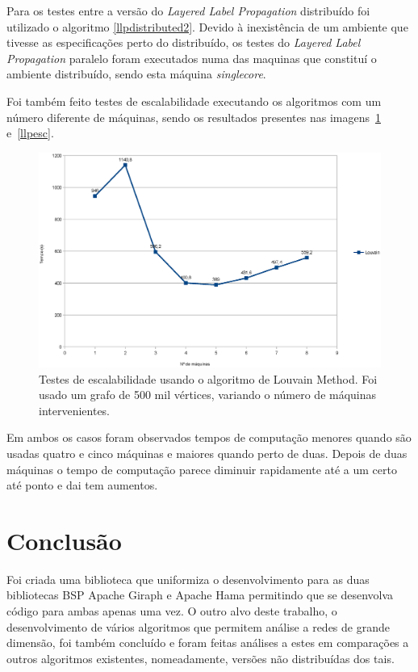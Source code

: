 Para os testes entre a versão do \textit{Layered Label Propagation} distribuído 
foi utilizado o algoritmo \ref{llpdistributed2}. Devido à inexistência de um 
ambiente que tivesse as especificações perto do distribuído, os testes do 
\textit{Layered Label Propagation} paralelo foram executados numa das maquinas 
que constituí o ambiente distribuído, sendo esta máquina \textit{singlecore}.

Foi também feito testes de escalabilidade executando os algoritmos com um número diferente de máquinas, sendo os resultados presentes nas imagens~\ref{louvainesc} e~\ref{llpesc}.

\begin{figure}
  \centering
  \includegraphics[width=\linewidth]{lov}
  \caption{Testes de escalabilidade usando o algoritmo de Louvain Method. Foi usado um grafo de 500 mil vértices, variando o número de máquinas intervenientes.}
	\label{louvainesc}
\end{figure}

Em ambos os casos foram observados tempos de computação menores quando são usadas quatro e cinco máquinas e maiores quando perto de duas. Depois de duas máquinas o tempo de computação parece diminuir rapidamente até a um certo até ponto e dai tem aumentos.

\chapter{Conclusão}
Foi criada uma biblioteca que uniformiza o desenvolvimento para as duas bibliotecas BSP Apache Giraph e Apache Hama permitindo que se desenvolva código para ambas apenas uma vez. O outro alvo deste trabalho, o desenvolvimento de vários algoritmos que permitem análise a redes de grande dimensão, foi também concluído e foram feitas análises a estes em comparações a outros algoritmos existentes, nomeadamente, versões não distribuídas dos tais.

